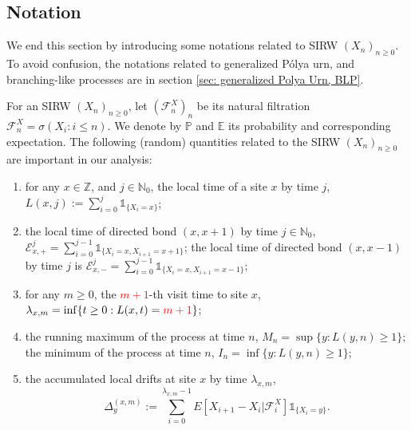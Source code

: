 \documentclass[twoside,12pt,a4paper]{article}
\numberwithin{equation}{section}
\newcommand{\edt}[1]{\textcolor{red}{#1}} %
\begin{document}
	\subsection{Notation}
	We end this section by introducing some notations related to SIRW $(X_n)_{n\geq 0}$. To avoid confusion, the notations related to generalized P\'{o}lya urn, and branching-like processes are in section \ref{sec: generalized Polya Urn, BLP}.
	
	For an SIRW $(X_n)_{n\geq 0}$,  let $(\mathcal{F}^X_n)_n$ be its natural filtration $\mathcal{F}^X_n = \sigma\left(X_i: i\leq n \right).$ We denote by $\mathbb{P}$ and $\mathbb{E}$ its probability and corresponding expectation. The following (random) quantities related to the SIRW $(X_n)_{n\geq0}$ are important in our analysis:
	\begin{enumerate}
		\item for any $x \in \mathbb{Z}$, and $j\in \mathbb{N}_0$, the local time of a site $x$ by time $j$, $L(x,j):= \sum_{i=0}^j \mathbb{1}_{\{X_i=x\} }$; %
		
		\item the local time of directed bond $(x,x+1)$ by time $j\in \mathbb{N}_0$,
		$ \mathcal{E}^j_{x,+} = \sum_{i=0}^{j-1} \mathbb{1}_{\{X_i=x, X_{i+1} =x+1 \} } $; the local time of directed bond $(x,x-1)$ by time $j$ is $ \mathcal{E}^j_{x,-} = \sum_{i=0}^{j-1} \mathbb{1}_{\{X_i=x, X_{i+1} =x-1 \} }; $
		
		
		\item for any $m\geq 0$, the \edt{$m+1$}-th visit time to site $x$, $\lambda_{x,m} = \inf\{t \geq 0: L(x,t) = \edt{m+1} \}$;
		
		\item the running maximum of the process at time $n$, $M_n= \sup\{y: L(y,n)\geq 1 \} $; the minimum of the process at time $n$, $I_n= \inf\{y: L(y,n)\geq 1 \} $;
		
		\item 
		the accumulated local drifts at site $x$ by time $\lambda_{x,m}$, 
		\begin{equation}\label{eq: accumulated local drift}
			\Delta_y^{(x,m)}:= \sum_{i=0}^{\lambda_{x,m}-1} E[X_{i+1}-X_i\vert \mathcal{F}_{i}^X] \mathbb{1}_{\{X_i=y\}}.
		\end{equation}
	\end{enumerate}
	
\end{document}
